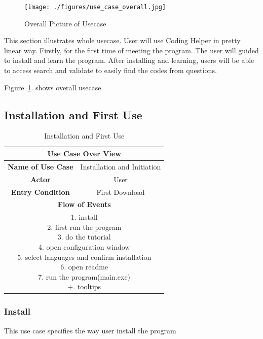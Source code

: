 \documentclass[conference]{IEEEtran}
\begin{document}
\begin{figure}[ht]
\centering
\texttt{[image: ./figures/use\_case\_overall.jpg]}
\caption{Overall Picture of Usecase}
\label{fig:usecase}
\end{figure}
This section illustrates whole usecase. User will use Coding Helper in pretty linear way. Firstly, for the first time of meeting the program.
The user will guided to install and learn the program.
After installing and learning, users will be able to access search and validate to easily find the codes from questions.

Figure~\ref{fig:usecase}. shows overall usecase.  

\subsection{Installation and First Use}
\begin{table}[ht]
\renewcommand{\arraystretch}{1}
\caption{Installation and First Use}
\label{table:usecase1}
\centering
\begin{adjustbox}{width=0.4 \textwidth}
\small
\begin{tabular}{c|c}
\hline
\multicolumn{2}{c}{\textbf{Use Case Over View}} \\
\hline
\textbf{Name of Use Case} & Installation and Initiation \\
\hline
\textbf{Actor} & User \\
\hline
\textbf{Entry Condition} & First Download\\
\hline
\multicolumn{2}{c}{\textbf{Flow of Events}}\\
\hline
\multicolumn{2}{c}{
\parbox[t]{5cm}{
  1. install \\
  2. first run the program \\
  3. do the tutorial \\
  4. open configuration window \\
  5. select languages and confirm installation \\
  6. open readme \\
  7. run the program(main.exe) \\
  +. tooltips
  }
}\\
\hline

\end{tabular}
\end{adjustbox}
\end{table}
%

\subsubsection{Install}
This use case specifies the way user install the program
\end{document}
